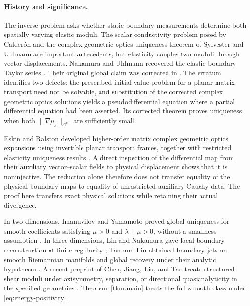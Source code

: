 \paragraph{History and significance.}
The inverse problem asks whether static boundary measurements determine
both spatially varying elastic moduli.
The scalar conductivity problem posed by Calder\'on
\cite{Calderon1980} and the complex geometric optics uniqueness theorem
of Sylvester and Uhlmann \cite{SylvesterUhlmann1987} are important
antecedents, but elasticity couples two moduli through vector
displacements. Nakamura and Uhlmann recovered the elastic boundary
Taylor series \cite{NakamuraUhlmann1995Boundary}. Their original global
claim \cite{NU1994} was corrected in \cite{NU2003}. The erratum identifies
two defects: the prescribed initial-value problem for a planar matrix
transport need not be solvable, and substitution of the corrected complex
geometric optics solutions yields a pseudodifferential equation where a
partial differential equation had been asserted. Its corrected theorem
proves uniqueness when both $\|\nabla\mu_j\|_{C^m}$ are sufficiently
small.

Eskin and Ralston developed higher-order matrix complex geometric optics
expansions using invertible planar transport frames, together with
restricted elasticity uniqueness results
\cite{EskinRalston2002Elasticity,EskinRalston2004}. A direct inspection of
the differential map from their auxiliary vector--scalar fields to
physical displacement \cite[Section~3]{EskinRalston2004} shows that it is
noninjective. The reduction alone therefore does not transfer equality
of the physical boundary maps to equality of unrestricted auxiliary
Cauchy data. The proof here transfers exact physical solutions while
retaining their actual divergence.

In two dimensions, Imanuvilov and Yamamoto proved global uniqueness for
smooth coefficients satisfying $\mu>0$ and $\lambda+\mu>0$, without a
smallness assumption \cite{ImanuvilovYamamoto2015Elasticity}.
In three dimensions, Lin and Nakamura gave local boundary reconstruction
at finite regularity \cite{LinNakamura2017}; Tan and Liu obtained boundary
jets on smooth Riemannian manifolds and global recovery under their
analytic hypotheses
\cite{TanLiu2023}. A recent preprint of Chen, Jiang, Liu, and Tao treats
structured shear moduli under axisymmetry, separation, or directional
quasianalyticity in the specified geometries
\cite{ChenJiangLiuTao2026Elasticity}.
Theorem~\ref{thm:main} treats the full smooth class under
\eqref{eq:energy-positivity}.

